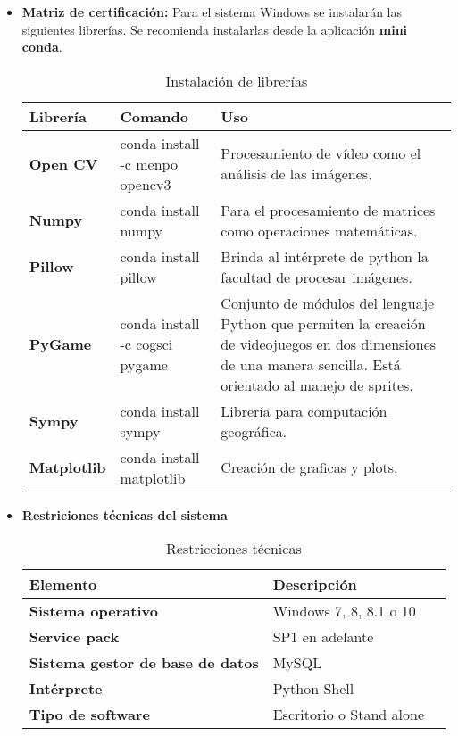 \begin{itemize}
\item \textbf{Matriz de certificación:}
Para el sistema Windows se instalarán las siguientes
librerías. Se recomienda instalarlas desde la 
aplicación \textbf{mini conda}.
\begin{longtable}{ | p{3.0cm} | p{5.5cm} | p{6.0cm} | }
	\caption{Instalación de librerías}
	\label{table:librerias}
	\\	\hline
		 \textbf{Librería} &\textbf{Comando}&\textbf{Uso}
		\\ \hline
        \textbf{Open CV}&conda install -c menpo opencv3&Procesamiento de vídeo como el 
        análisis de las imágenes.
        \\ \hline
        \textbf{Numpy}&conda install numpy&Para el procesamiento de matrices como 
        operaciones matemáticas.
        \\ \hline
        \textbf{Pillow}&conda install pillow&Brinda al intérprete de python la 
        facultad de procesar imágenes.
        \\ \hline
        \textbf{PyGame}&conda install -c cogsci pygame&Conjunto de módulos del 
        lenguaje Python que permiten la creación de videojuegos en dos dimensiones de 
        una manera sencilla. Está orientado al manejo de sprites.
        \\ \hline
        \textbf{Sympy}&conda install sympy&Librería para computación geográfica.
        \\ \hline
        \textbf{Matplotlib}&conda install matplotlib&Creación de graficas  y plots.
         \\ \hline
\end{longtable}
\item \textbf{Restriciones técnicas del sistema}
\begin{longtable}{ | p{6.0cm} | p{5.5cm} | p{5.5cm} | }
	\caption{Restricciones técnicas}
	\label{table:restriccionestec}
	\\	\hline
		 \textbf{Elemento} &\textbf{Descripción}
		\\ \hline
        \textbf{Sistema operativo}&Windows 7, 8, 8.1 o 10
        \\ \hline
        \textbf{Service pack}&SP1 en adelante
        \\ \hline
        \textbf{Sistema gestor de base de datos}&MySQL
        \\ \hline
        \textbf{Intérprete}&Python Shell
        \\ \hline
        \textbf{Tipo de software}&Escritorio o Stand alone
        \\ \hline
\end{longtable}
\end{itemize}